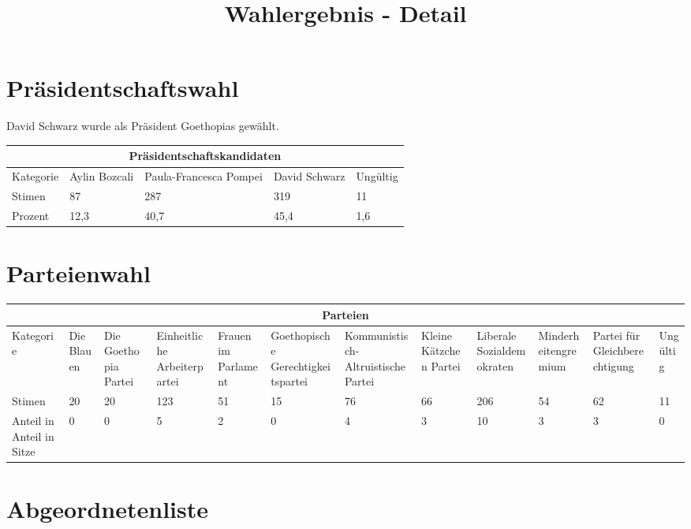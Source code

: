 \documentclass{sasbase}
\begin{document}
\onecolumn
\title{Wahlergebnis - Detail}

\mytitle

\setlength{\parindent}{0mm}
\setlength{\parskip}{2mm}

\section{Präsidentschaftswahl}

David Schwarz wurde als Präsident Goethopias gewählt.
\begin{tabular}{ |p{3cm}||p{3cm}|p{3cm}|p{3cm}|p{3cm}|  }
 \hline
 \multicolumn{5}{|c|}{Präsidentschaftskandidaten} \\
 \hline
 Kategorie & Aylin Bozcali  & Paula-Francesca Pompei & David Schwarz & Ungültig\\
 \hline
 Stimen   & 87    & 287 &   319 & 11 \\
 Prozent &  12,3  & 40,7   & 45,4 & 1,6 \\
 \hline
\end{tabular}



\section{Parteienwahl}

\begin{tabular}{ |p{3cm}||p{3cm}|p{3cm}|p{3cm}|p{3cm}|p{3cm}|p{3cm}|p{3cm}|p{3cm}|p{3cm}|p{3cm}|p{3cm}|  }
 \hline
 \multicolumn{12}{|c|}{Parteien} \\
 \hline
 Kategorie & Die Blauen  & Die Goethopia Partei & Einheitliche Arbeiterpartei & Frauen im Parlament & Goethopische Gerechtigkeitspartei & Kommunistisch-Altruistische Partei & Kleine Kätzchen Partei & Liberale Sozialdemokraten & Minderheitengremium & Partei für Gleichberechtigung & Ungültig\\
 \hline
 Stimen   & 20 & 20  & 123 & 51 & 15 & 76 & 66 & 206 & 54 & 62 & 11 \\
 Anteil in %
 Anteil in %
 Sitze & 0 & 0 & 5 & 2 & 0 & 4 & 3 & 10 & 3 & 3 & 0\\
 \hline
\end{tabular}

\section{Abgeordnetenliste}
\end{document}
